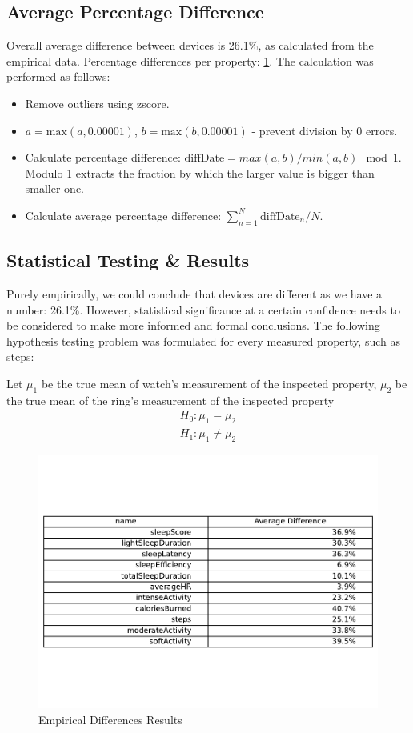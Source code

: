 \subsection{Average Percentage Difference}
Overall average difference between devices is 26.1\%, as calculated from the empirical data. Percentage differences per property: \ref{fig:empirical}. The calculation was performed as follows: 
\begin{itemize}
    \item Remove outliers using zscore.
    \item $a = \text{max}(a, 0.00001)$, $b = \text{max}(b, 0.00001)$ - prevent division by 0 errors.
    \item Calculate percentage difference: $\text{diffDate} = max(a,b) / min(a,b) \mod 1$. Modulo 1 extracts the fraction by which the larger value is bigger than smaller one.
    \item Calculate average percentage difference: $\sum_{n=1}^{N} \text{diffDate}_n / N$.
\end{itemize}
\subsection{Statistical Testing \& Results}
Purely empirically, we could conclude that devices are different as we have a number: 26.1\%. However, statistical significance at a certain confidence needs to be considered to make more informed and formal conclusions. The following hypothesis testing problem was formulated for every measured property, such as steps: 

Let $\mu_1$ be the true mean of watch's measurement of the inspected property, $\mu_2$ be the true mean of the ring's measurement of the inspected property
\begin{align*}
    H_0:\mu_1 = \mu_2 \\
    H_1: \mu_1 \neq \mu_2
\end{align*}
\begin{figure}
    
    \centering
    \includegraphics[width=\textwidth,keepaspectratio]{../images/empiricalResults.pdf}
    \caption{Empirical Differences Results}
    \label{fig:empirical}
    
\end{figure}

